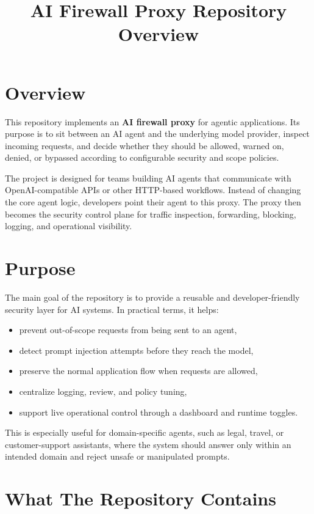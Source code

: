 \documentclass[11pt]{article}
\title{\textbf{AI Firewall Proxy Repository Overview}}
\author{}
\date{}
\begin{document}
\maketitle
\thispagestyle{empty}

\section*{Overview}

This repository implements an \textbf{AI firewall proxy} for agentic applications. Its purpose is to sit between an AI agent and the underlying model provider, inspect incoming requests, and decide whether they should be allowed, warned on, denied, or bypassed according to configurable security and scope policies.

The project is designed for teams building AI agents that communicate with OpenAI-compatible APIs or other HTTP-based workflows. Instead of changing the core agent logic, developers point their agent to this proxy. The proxy then becomes the security control plane for traffic inspection, forwarding, blocking, logging, and operational visibility.

\section*{Purpose}

The main goal of the repository is to provide a reusable and developer-friendly security layer for AI systems. In practical terms, it helps:

\begin{itemize}[leftmargin=1.2em]
    \item prevent out-of-scope requests from being sent to an agent,
    \item detect prompt injection attempts before they reach the model,
    \item preserve the normal application flow when requests are allowed,
    \item centralize logging, review, and policy tuning,
    \item support live operational control through a dashboard and runtime toggles.
\end{itemize}

This is especially useful for domain-specific agents, such as legal, travel, or customer-support assistants, where the system should answer only within an intended domain and reject unsafe or manipulated prompts.

\section*{What The Repository Contains}
\end{document}
